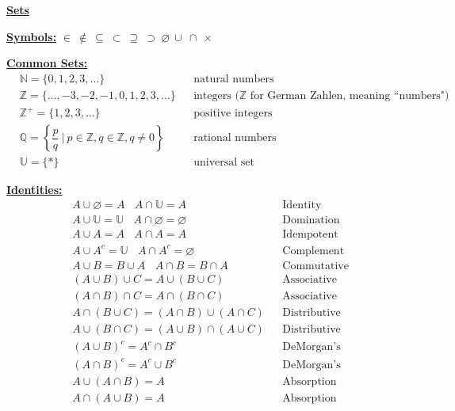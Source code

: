 \documentclass[11pt]{article}
\begin{document}
\newpage
{}

\begin{center}\underline{\bf \huge Sets}\end{center}
\bigskip

\underline{\bf Symbols:} $\in \ \not\in \ \subseteq \ \subset \ \supseteq \ \supset \ \varnothing \ \cup \ \cap \ \times$
\bigskip

\underline{\bf Common Sets:} 
\begin{align*}
    &\mathbb{N} = \{0, 1, 2, 3, \dots\}  &&\text{natural numbers} \\
    &\mathbb{Z} = \{\dots, -3, -2, -1, 0, 1, 2, 3, \dots \}  &&\text{integers ($\mathbb{Z}$ for German Zahlen, meaning ``numbers")} \\
    &\mathbb{Z^+} = \{1,2,3,\dots\}  &&\text{positive integers} \\
    &\mathbb{Q} = \left\{ \dfrac{p}{q} \ \Big| \ p \in \mathbb{Z}, q \in \mathbb{Z}, q \neq 0\right\}  &&\text{rational numbers} \\
    &\mathbb{U} = \{*\}  &&\text{universal set}
\end{align*}
\bigskip

\underline{\bf Identities:}
\begin{align*}
    &A \cup \varnothing = A \ \ \ \ A \cap \mathbb{U} = A &&\text{Identity} \\
    &A \cup \mathbb{U} = \mathbb{U} \ \ \ \ A \cap \mathbb{\varnothing} = \varnothing &&\text{Domination} \\
    &A \cup A = A \ \ \ \ A \cap A = A &&\text{Idempotent} \\
    &A \cup A^c = \mathbb{U} \ \ \ \ A \cap A^c = \varnothing &&\text{Complement} \\
    &A \cup B = B \cup A \ \ \ \ A \cap B = B \cap A &&\text{Commutative} \\
    &(A \cup B ) \cup C = A \cup (B \cup C) &&\text{Associative} \\
    &(A \cap B) \cap C = A \cap (B \cap C) &&\text{Associative} \\
    &A \cap (B \cup C) = (A \cap B) \cup (A \cap C) &&\text{Distributive} \\
    &A \cup (B \cap C) = (A \cup B) \cap (A \cup C) &&\text{Distributive} \\
    &(A \cup B)^c = A^c \cap B^c &&\text{DeMorgan's} \\
    &(A \cap B)^c = A^c \cup B^c &&\text{DeMorgan's} \\
    &A \cup (A \cap B) = A &&\text{Absorption} \\
    &A \cap (A \cup B) = A &&\text{Absorption}
\end{align*}
\bigskip
\end{document}
